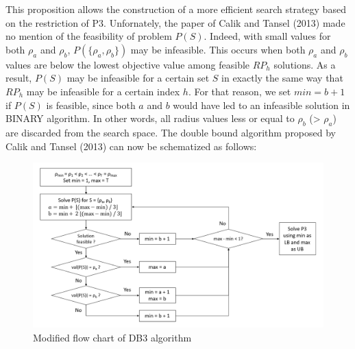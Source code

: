 This proposition allows the construction of a more efficient search strategy based on the restriction of P3. 
Unfornately, the paper of Calik and Tansel (2013) made no mention of the feasibility of problem $P(S)$.
Indeed, with small values for both $\rho_a$ and $\rho_b$, $P(\{\rho_a, \rho_b\})$ may be infeasible.
This occurs when both $\rho_a$ and $\rho_b$ values are below the lowest objective value among feasible $RP_h$ solutions.
As a result, $P(S)$ may be infeasible for a certain set $S$ in exactly the same way that $RP_h$ may be infeasible for a certain index $h$.
For that reason, we set $min = b + 1$ if $P(S)$ is feasible, since both $a$ and $b$ would have led to an infeasible solution in BINARY algorithm.
In other words, all radius values less or equal to $\rho_b$ (> $\rho_a$) are discarded from the search space.
The double bound algorithm proposed by Calik and Tansel (2013) can now be schematized as follows:
\begin{figure}[H]
	\begin{center}
		\includegraphics[width=\textwidth]{../imgs/DB3.png}
		\caption{Modified flow chart of DB3 algorithm}
	\end{center}
\end{figure}